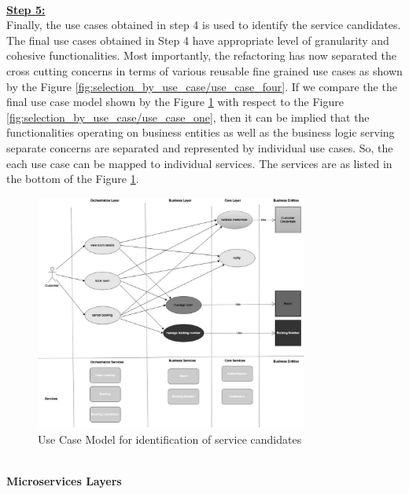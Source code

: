 \\
\textbf{\underline{Step 5:}}
\\
Finally, the use cases obtained in step 4 is used to identify the service candidates. The final use cases obtained in Step 4 have appropriate level of granularity and cohesive functionalities. Most importantly, the refactoring has now separated the cross cutting concerns in terms of various reusable fine grained use cases as shown by the Figure \ref{fig:selection_by_use_case/use_case_four}. If we compare the the final use case model shown by the Figure  \ref{fig:selection_by_use_case/use_case_five} with respect to the Figure \ref{fig:selection_by_use_case/use_case_one}, then it can be implied that the functionalities operating on business entities as well as the business logic serving separate concerns are separated and represented by individual use cases. So, the each use case can be mapped to individual services. The services are as listed in the bottom of the Figure \ref{fig:selection_by_use_case/use_case_five}.
\\
\begin{figure}[H]
\begin{center}
\includegraphics[width=0.8\textwidth]{figures/use-case-five}
\caption{Use Case Model for identification of service candidates}
\label{fig:selection_by_use_case/use_case_five}
\end{center}
\end{figure}
\\
\textbf{Microservices Layers}\\
